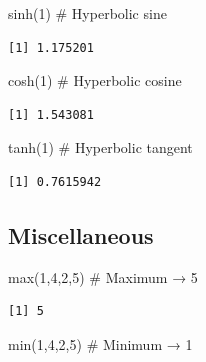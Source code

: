 \documentclass[
  letterpaper,
  DIV=11,
  numbers=noendperiod]{scrreprt}
\newenvironment{Shaded}{\begin{snugshade}}{\end{snugshade}}
\newcommand{\CommentTok}[1]{\textcolor[rgb]{0.37,0.37,0.37}{#1}}
\newcommand{\DecValTok}[1]{\textcolor[rgb]{0.68,0.00,0.00}{#1}}
\newcommand{\FunctionTok}[1]{\textcolor[rgb]{0.28,0.35,0.67}{#1}}
\newcommand{\NormalTok}[1]{\textcolor[rgb]{0.00,0.23,0.31}{#1}}
\begin{document}
\begin{Shaded}
\begin{Highlighting}[]
\FunctionTok{sinh}\NormalTok{(}\DecValTok{1}\NormalTok{)                }\CommentTok{\# Hyperbolic sine}
\end{Highlighting}
\end{Shaded}

\begin{verbatim}
[1] 1.175201
\end{verbatim}

\begin{Shaded}
\begin{Highlighting}[]
\FunctionTok{cosh}\NormalTok{(}\DecValTok{1}\NormalTok{)                }\CommentTok{\# Hyperbolic cosine}
\end{Highlighting}
\end{Shaded}

\begin{verbatim}
[1] 1.543081
\end{verbatim}

\begin{Shaded}
\begin{Highlighting}[]
\FunctionTok{tanh}\NormalTok{(}\DecValTok{1}\NormalTok{)                }\CommentTok{\# Hyperbolic tangent}
\end{Highlighting}
\end{Shaded}

\begin{verbatim}
[1] 0.7615942
\end{verbatim}

\subsection{Miscellaneous}\label{miscellaneous}

\begin{Shaded}
\begin{Highlighting}[]
\FunctionTok{max}\NormalTok{(}\DecValTok{1}\NormalTok{,}\DecValTok{4}\NormalTok{,}\DecValTok{2}\NormalTok{,}\DecValTok{5}\NormalTok{)           }\CommentTok{\# Maximum → 5}
\end{Highlighting}
\end{Shaded}

\begin{verbatim}
[1] 5
\end{verbatim}

\begin{Shaded}
\begin{Highlighting}[]
\FunctionTok{min}\NormalTok{(}\DecValTok{1}\NormalTok{,}\DecValTok{4}\NormalTok{,}\DecValTok{2}\NormalTok{,}\DecValTok{5}\NormalTok{)           }\CommentTok{\# Minimum → 1}
\end{Highlighting}
\end{Shaded}
\end{document}
